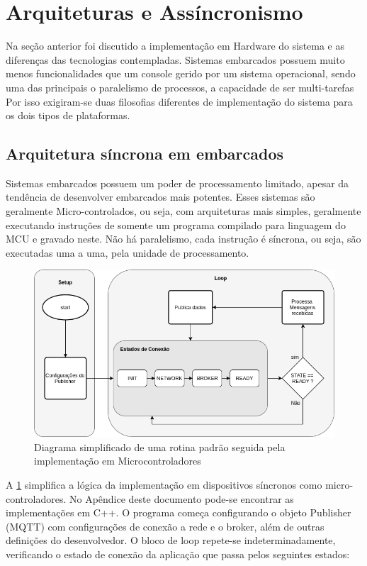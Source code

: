 \section{Arquiteturas e Assíncronismo}
\label{section:arquitetura}

Na seção anterior foi discutido a implementação em Hardware do sistema e as diferenças das tecnologias contempladas. Sistemas embarcados 
possuem muito menos funcionalidades que um console gerido por um sistema operacional, sendo uma das principais o paralelismo de processos, a capacidade de ser multi-tarefas Por isso exigiram-se duas filosofias diferentes de implementação do sistema para os dois tipos de plataformas.

\subsection{Arquitetura síncrona em embarcados}
\label{subsection:embarcados_sinc}

Sistemas embarcados possuem um poder de processamento limitado, apesar da tendência de desenvolver embarcados mais potentes. Esses sistemas são geralmente Micro-controlados, ou seja, com arquiteturas mais simples, geralmente executando instruções de somente um programa compilado para linguagem do MCU e gravado neste. Não há paralelismo, cada instrução é síncrona, ou seja, são executadas uma a uma, pela unidade de processamento.

\begin{figure}[h!]
\centering
\includegraphics[width=12cm]{./02_Capitulos/02_Cap3/figures/sinc_implementation}
\caption{Diagrama simplificado de uma rotina padrão seguida pela implementação em Microcontroladores}
\label{fig:sinc-implementation}
\end{figure}

A \ref{fig:sinc-implementation} simplifica a lógica da implementação em dispositivos síncronos como micro-controladores. No Apêndice deste documento pode-se encontrar as implementações em C++. O programa começa configurando o objeto Publisher (MQTT) com configurações de conexão a rede e o broker, além de outras definições do desenvolvedor. O bloco de loop repete-se indeterminadamente, verificando o estado de conexão da aplicação que passa pelos seguintes estados:

